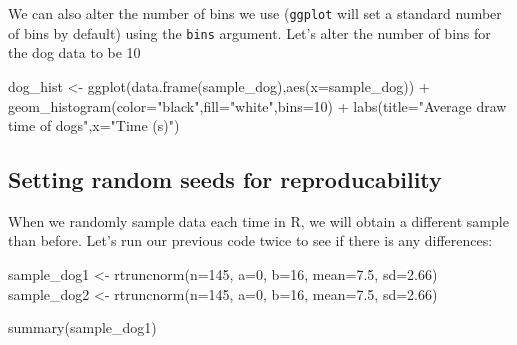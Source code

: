 \documentclass[
]{book}
\newenvironment{Shaded}{\begin{snugshade}}{\end{snugshade}}
\newcommand{\AttributeTok}[1]{\textcolor[rgb]{0.77,0.63,0.00}{#1}}
\newcommand{\DecValTok}[1]{\textcolor[rgb]{0.00,0.00,0.81}{#1}}
\newcommand{\FloatTok}[1]{\textcolor[rgb]{0.00,0.00,0.81}{#1}}
\newcommand{\FunctionTok}[1]{\textcolor[rgb]{0.00,0.00,0.00}{#1}}
\newcommand{\NormalTok}[1]{#1}
\newcommand{\OtherTok}[1]{\textcolor[rgb]{0.56,0.35,0.01}{#1}}
\newcommand{\SpecialCharTok}[1]{\textcolor[rgb]{0.00,0.00,0.00}{#1}}
\newcommand{\StringTok}[1]{\textcolor[rgb]{0.31,0.60,0.02}{#1}}
\begin{document}
We can also alter the number of bins we use (\texttt{ggplot} will set a standard number of bins by default) using the \texttt{bins} argument. Let's alter the number of bins for the dog data to be 10

\begin{Shaded}
\begin{Highlighting}[]
\NormalTok{dog\_hist }\OtherTok{\textless{}{-}} \FunctionTok{ggplot}\NormalTok{(}\FunctionTok{data.frame}\NormalTok{(sample\_dog),}\FunctionTok{aes}\NormalTok{(}\AttributeTok{x=}\NormalTok{sample\_dog)) }\SpecialCharTok{+} \FunctionTok{geom\_histogram}\NormalTok{(}\AttributeTok{color=}\StringTok{"black"}\NormalTok{,}\AttributeTok{fill=}\StringTok{"white"}\NormalTok{,}\AttributeTok{bins=}\DecValTok{10}\NormalTok{) }\SpecialCharTok{+} 
  \FunctionTok{labs}\NormalTok{(}\AttributeTok{title=}\StringTok{"Average draw time of dogs"}\NormalTok{,}\AttributeTok{x=}\StringTok{"Time (s)"}\NormalTok{)}
\end{Highlighting}
\end{Shaded}

\hypertarget{setting-random-seeds-for-reproducability}{%
\subsection{Setting random seeds for reproducability}\label{setting-random-seeds-for-reproducability}}

When we randomly sample data each time in R, we will obtain a different sample than before. Let's run our previous code twice to see if there is any differences:

\begin{Shaded}
\begin{Highlighting}[]
\NormalTok{sample\_dog1 }\OtherTok{\textless{}{-}} \FunctionTok{rtruncnorm}\NormalTok{(}\AttributeTok{n=}\DecValTok{145}\NormalTok{, }\AttributeTok{a=}\DecValTok{0}\NormalTok{, }\AttributeTok{b=}\DecValTok{16}\NormalTok{, }\AttributeTok{mean=}\FloatTok{7.5}\NormalTok{, }\AttributeTok{sd=}\FloatTok{2.66}\NormalTok{)}
\NormalTok{sample\_dog2 }\OtherTok{\textless{}{-}} \FunctionTok{rtruncnorm}\NormalTok{(}\AttributeTok{n=}\DecValTok{145}\NormalTok{, }\AttributeTok{a=}\DecValTok{0}\NormalTok{, }\AttributeTok{b=}\DecValTok{16}\NormalTok{, }\AttributeTok{mean=}\FloatTok{7.5}\NormalTok{, }\AttributeTok{sd=}\FloatTok{2.66}\NormalTok{)}

\FunctionTok{summary}\NormalTok{(sample\_dog1)}
\end{Highlighting}
\end{Shaded}
\end{document}
